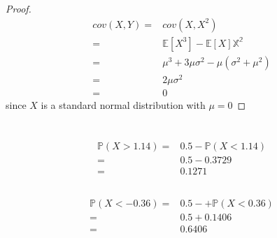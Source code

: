\documentclass{article}
\begin{document}
    \section{}
        \begin{proof}
            \begin{equation*}
                \begin{split}
                    cov(X,Y)=&cov(X,X^2)\\
                        =&\mathbb{E}[X^3]-\mathbb{E}[X]\mathbb{X^2}\\
                        =&\mu^3+3\mu\sigma^2-\mu(\sigma^2+\mu^2)\\
                        =&2\mu\sigma^2\\
                        =&0
                \end{split}
            \end{equation*}
        since $X$ is a standard normal distribution with $\mu=0$
        \end{proof}

    \section{}
        \subsection{}
            \begin{equation*}
                \begin{split}
                    \mathbb{P}(X>1.14)=&0.5-\mathbb{P}(X<1.14)\\
                        =&0.5-0.3729\\
                        =&0.1271
                \end{split}
            \end{equation*}
        \subsection{}
            \begin{equation*}
                \begin{split}
                    \mathbb{P}(X<-0.36)=&0.5-+\mathbb{P}(X<0.36)\\
                        =&0.5+0.1406\\
                        =&0.6406
                \end{split}
            \end{equation*}
\end{document}

